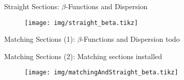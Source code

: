 \documentclass{beamer}
\begin{document}
\begin{frame}[t,fragile]{Straight Sections: $\beta$-Functions and Dispersion}
\begin{figure}
\centering
\texttt{[image: img/straight\_beta.tikz]}
\end{figure}
\end{frame}

\begin{frame}[t,fragile]{Matching Sections (1): $\beta$-Functions and Dispersion}
todo
\end{frame}

\begin{frame}[t,fragile]{Matching Sections (2): Matching sections installed}
\begin{figure}
\centering
\texttt{[image: img/matchingAndStraight\_beta.tikz]}
\end{figure}
\end{frame}
\end{document}
